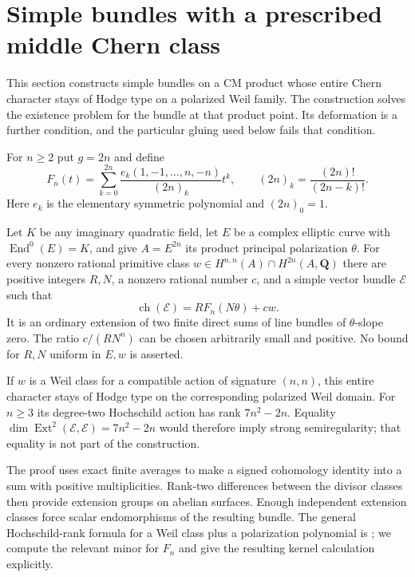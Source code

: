 \section{Simple bundles with a prescribed middle Chern class}
\label{sec:simple-hodge-bundles}

This section constructs simple bundles on a CM product whose entire
Chern character stays of Hodge type on a polarized Weil family.
The construction solves the existence problem for the bundle at that
product point.  Its deformation is a further condition, and the
particular gluing used below fails that condition.

For $n\ge2$ put $g=2n$ and define
\begin{equation}
 F_n(t)=\sum_{k=0}^{2n}
  \frac{e_k(1,-1,\ldots,n,-n)}{(2n)_k}t^k,
 \qquad (2n)_k=\frac{(2n)!}{(2n-k)!}.
 \label{eq:positive-character-polynomial}
\end{equation}
Here $e_k$ is the elementary symmetric polynomial and $(2n)_0=1$.

\begin{theorem}\label{thm:simple-hodge-bundle}
Let $K$ be any imaginary quadratic field, let $E$ be a complex
elliptic curve with $\operatorname{End}^0(E)=K$, and give
$A=E^{2n}$ its product principal polarization $\theta$.
For every nonzero rational primitive class
$w\in H^{n,n}(A)\cap H^{2n}(A,\mathbf Q)$ there are positive integers
$R,N$, a nonzero rational number $c$, and a simple vector bundle
$\mathcal E$ such that
\[
 \operatorname{ch}(\mathcal E)=R F_n(N\theta)+cw.
\]
It is an ordinary extension of two finite direct sums of line
bundles of $\theta$-slope zero.  The ratio $c/(RN^n)$ can be chosen
arbitrarily small and positive.  No bound for $R,N$ uniform in
$E,w$ is asserted.

If $w$ is a Weil class for a compatible action of signature $(n,n)$,
this entire character stays of Hodge type on the corresponding
polarized Weil domain.  For $n\ge3$ its degree-two Hochschild action
has rank $7n^2-2n$.  Equality
$\dim\operatorname{Ext}^2(\mathcal E,\mathcal E)=7n^2-2n$ would
therefore imply strong semiregularity; that equality is not part
of the construction.
\end{theorem}

The proof uses exact finite averages to make a signed cohomology
identity into a sum with positive multiplicities.  Rank-two
differences between the divisor classes then provide extension
groups on abelian surfaces.  Enough independent extension classes
force scalar endomorphisms of the resulting bundle.
The general Hochschild-rank formula for a Weil class plus a
polarization polynomial is
\cite[Theorem~A6]{BBK3Sixfolds}; we compute the relevant minor for
$F_n$ and give the resulting kernel calculation explicitly.

